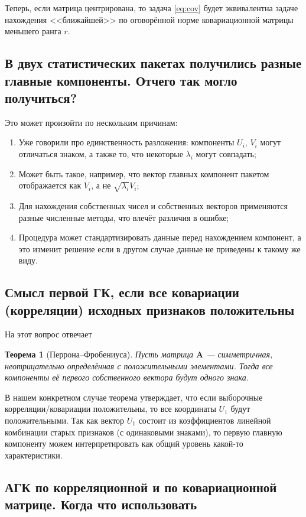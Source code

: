 \documentclass[12pt,a4paper,final]{article}
\newtheorem{theorem}{Теорема}
\begin{document}
Теперь, если матрица центрирована, то задача \ref{eq:cov} будет эквивалентна задаче нахождения <<ближайшей>> по оговорённой норме ковариационной матрицы меньшего ранга $r$.

\subsection{В двух статистических пакетах получились разные главные компоненты. Отчего так могло получиться?}

Это может произойти по нескольким причинам:

\begin{enumerate}
\item Уже говорили про единственность разложения: компоненты $U_i,\, V_i$ могут отличаться знаком, а также то, что некоторые $\lambda_i$ могут совпадать;
\item Может быть такое, например, что вектор главных компонент пакетом отображается как $V_i$, а не $\sqrt{\lambda_i} V_i$;
\item Для нахождения собственных чисел и собственных векторов применяются разные численные методы, что влечёт различия в ошибке;
\item Процедура может стандартизировать данные перед нахождением компонент, а это изменит решение если в другом случае данные не приведены к такому же виду.
\end{enumerate}

\subsection{Смысл первой ГК, если все ковариации (корреляции) исходных признаков положительны}

На этот вопрос отвечает

\begin{theorem}[Перрона--Фробениуса]
Пусть матрица $\bm A$ --- симметричная, неотрицательно определённая с положительными элементами. Тогда все компоненты её первого собственного вектора будут одного знака.
\end{theorem}

В нашем конкретном случае теорема утверждает, что если выборочные корреляции/ковариации положительны, то все координаты $U_1$ будут положительными. Так как вектор $U_1$ состоит из коэффициентов линейной комбинации старых признаков (с одинаковыми знаками), то первую главную компоненту можем интерпретировать как общий уровень какой-то характеристики.

\subsection{АГК по корреляционной и по ковариационной матрице. Когда что использовать}
\end{document}
